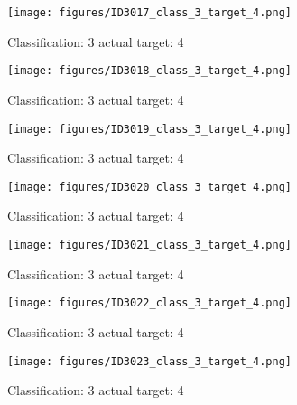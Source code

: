 \begin{figure}[h!]
\begin{center}
\texttt{[image: figures/ID3017\_class\_3\_target\_4.png]}
\end{center}
\caption{ Classification: 3 actual target: 4}
\label{fig:ID3017_class_3_target_4}
\end{figure}
\begin{figure}[h!]
\begin{center}
\texttt{[image: figures/ID3018\_class\_3\_target\_4.png]}
\end{center}
\caption{ Classification: 3 actual target: 4}
\label{fig:ID3018_class_3_target_4}
\end{figure}
\begin{figure}[h!]
\begin{center}
\texttt{[image: figures/ID3019\_class\_3\_target\_4.png]}
\end{center}
\caption{ Classification: 3 actual target: 4}
\label{fig:ID3019_class_3_target_4}
\end{figure}
\begin{figure}[h!]
\begin{center}
\texttt{[image: figures/ID3020\_class\_3\_target\_4.png]}
\end{center}
\caption{ Classification: 3 actual target: 4}
\label{fig:ID3020_class_3_target_4}
\end{figure}
\begin{figure}[h!]
\begin{center}
\texttt{[image: figures/ID3021\_class\_3\_target\_4.png]}
\end{center}
\caption{ Classification: 3 actual target: 4}
\label{fig:ID3021_class_3_target_4}
\end{figure}
\begin{figure}[h!]
\begin{center}
\texttt{[image: figures/ID3022\_class\_3\_target\_4.png]}
\end{center}
\caption{ Classification: 3 actual target: 4}
\label{fig:ID3022_class_3_target_4}
\end{figure}
\begin{figure}[h!]
\begin{center}
\texttt{[image: figures/ID3023\_class\_3\_target\_4.png]}
\end{center}
\caption{ Classification: 3 actual target: 4}
\label{fig:ID3023_class_3_target_4}
\end{figure}
